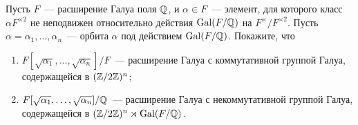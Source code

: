 \begin{exercise}[4-10]
Пусть $F$~--- расширение Галуа поля $\mathbb Q$, и $\alpha\in F$~--- элемент, для которого класс $\alpha F^{\times2}$ не неподвижен
относительно действия $\operatorname{Gal}(F/\mathbb Q)$ на $F^\times/F^{\times2}$. Пусть $\alpha=\alpha_1,\dots,\alpha_n$~--- орбита $\alpha$ под
действием $\operatorname{Gal}(F/\mathbb Q)$. Покажите, что
\begin{enumerate}[label=(\alph*)]
\item $F[\sqrt{\alpha_1},\dots,\sqrt{\alpha_n}]/F$~--- расширение Галуа с коммутативной группой Галуа, содержащейся в
$(\mathbb Z/2\mathbb Z)^n$;
\item $F[\sqrt{\alpha_1},\dots,\sqrt{\alpha_n}]/\mathbb Q$~--- расширение Галуа с некоммутативной группой Галуа, содержащейся в
$(\mathbb Z/2\mathbb Z)^n\rtimes\operatorname{Gal}(F/\mathbb Q)$.
\end{enumerate}
\end{exercise}

